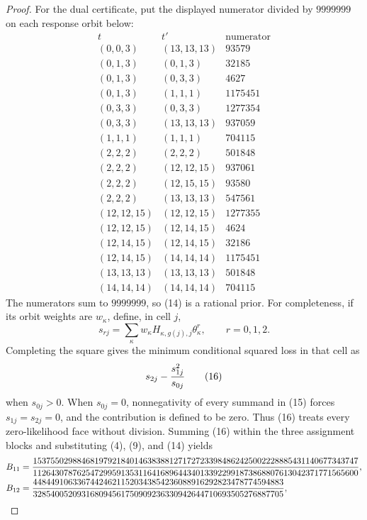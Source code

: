 \documentclass{article}
\begin{document}
\begin{proof}
For the dual certificate, put the displayed numerator divided by \(9999999\) on each response orbit below:
\[
\begin{array}{c|c|r}
t&t'&\text{numerator}\\ \hline
(0,0,3)&(13,13,13)&93579\\
(0,1,3)&(0,1,3)&32185\\
(0,1,3)&(0,3,3)&4627\\
(0,1,3)&(1,1,1)&1175451\\
(0,3,3)&(0,3,3)&1277354\\
(0,3,3)&(13,13,13)&937059\\
(1,1,1)&(1,1,1)&704115\\
(2,2,2)&(2,2,2)&501848\\
(2,2,2)&(12,12,15)&937061\\
(2,2,2)&(12,15,15)&93580\\
(2,2,2)&(13,13,13)&547561\\
(12,12,15)&(12,12,15)&1277355\\
(12,12,15)&(12,14,15)&4624\\
(12,14,15)&(12,14,15)&32186\\
(12,14,15)&(14,14,14)&1175451\\
(13,13,13)&(13,13,13)&501848\\
(14,14,14)&(14,14,14)&704115
\end{array}                                                                 \tag{14}
\]
The numerators sum to \(9999999\), so (14) is a rational prior.  For completeness, if its orbit weights are \(w_\kappa\), define, in cell \(j\),
\[
s_{rj}=\sum_\kappa w_\kappa H_{\kappa,g(j),j}\theta_\kappa^r,
\qquad r=0,1,2.                                                            \tag{15}
\]
Completing the square gives the minimum conditional squared loss in that cell as
\[
s_{2j}-{s_{1j}^2\over s_{0j}}                                               \tag{16}
\]
when \(s_{0j}>0\).  When \(s_{0j}=0\), nonnegativity of every summand in (15) forces \(s_{1j}=s_{2j}=0\), and the contribution is defined to be zero.  Thus (16) treats every zero-likelihood face without division.  Summing (16) within the three assignment blocks and substituting (4), (9), and (14) yields
\[
\begin{split}
B_{11}&={15375502988468197921840146383881271727233984862425002228885431140677343747
\over11264307876254729959135311641689644340133922991873868807613042371771565600},\\
B_{12}&={448449106336744246211520343854236088916292823478774594883
\over328540052093168094561750909236330942644710693505276887705},\\

\end{split}\]
\end{proof}
\end{document}

